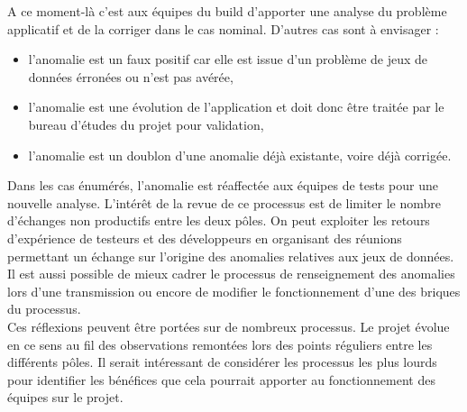 \documentclass[12pt,a4paper]{article}
\begin{document}
A ce moment-là c'est aux équipes du build d'apporter une analyse du problème applicatif et de la corriger dans le cas nominal. D'autres cas sont à envisager :
\begin{itemize}
\item l'anomalie est un faux positif car elle est issue d'un problème de jeux de données érronées ou n'est pas avérée,
\item l'anomalie est une évolution de l'application et doit donc être traitée par le bureau d'études du projet pour validation,
\item l'anomalie est un doublon d'une anomalie déjà existante, voire déjà corrigée.
\end{itemize} 
Dans les cas énumérés, l'anomalie est réaffectée aux équipes de tests pour une nouvelle analyse. L'intérêt de la revue de ce processus est de limiter le nombre d'échanges non productifs entre les deux pôles. On peut exploiter les retours d'expérience de testeurs et des développeurs en organisant des réunions permettant un échange sur l'origine des anomalies relatives aux jeux de données. Il est aussi possible de mieux cadrer le processus de renseignement des anomalies lors d'une transmission ou encore de modifier le fonctionnement d'une des briques du processus.\\
Ces réflexions peuvent être portées sur de nombreux processus. Le projet évolue en ce sens au fil des observations remontées lors des points réguliers entre les différents pôles. Il serait intéressant de considérer les processus les plus lourds pour identifier les bénéfices que cela pourrait apporter au fonctionnement des équipes sur le projet.

\clearpage
\newpage
\end{document}
